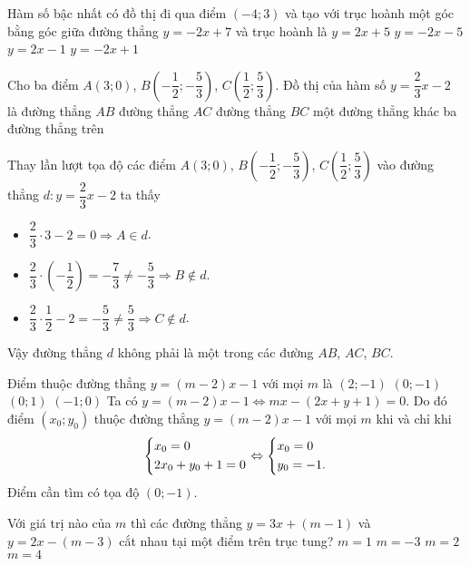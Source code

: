 \begin{ex}%
	Hàm số bậc nhất có đồ thị đi qua điểm $(-4;3)$ và tạo với trục hoành một góc bằng góc giữa đường thẳng $y=-2x+7$ và trục hoành là
	\choice
	{$y=2x+5$}
	{\True $y=-2x-5$}
	{$y=2x-1$}
	{$y=-2x+1$}
\end{ex}


\begin{ex}%
	Cho ba điểm $A(3;0)$, $B\left(-\dfrac{1}{2};-\dfrac{5}{3} \right)$, $C\left(\dfrac{1}{2};\dfrac{5}{3} \right)$. Đồ thị của hàm số $y=\dfrac{2}{3}x-2$ là
	\choice
	{đường thẳng $AB$}
	{đường thẳng $AC$}
	{đường thẳng $BC$}
	{\True một đường thẳng khác ba đường thẳng trên}
	\loigiai
	{
		Thay lần lượt tọa độ các điểm $A(3;0)$, $B\left(-\dfrac{1}{2};-\dfrac{5}{3} \right)$, $C\left(\dfrac{1}{2};\dfrac{5}{3} \right)$ vào đường thẳng $d\colon y=\dfrac{2}{3}x-2$ ta thấy
		\begin{itemize}
			\item $\dfrac{2}{3}\cdot 3-2=0\Rightarrow A\in d$.
			\item $\dfrac{2}{3}\cdot \left(-\dfrac{1}{2}\right)=-\dfrac{7}{3}\neq -\dfrac{5}{3}\Rightarrow B\notin d$.
			\item $\dfrac{2}{3}\cdot \dfrac{1}{2}-2=-\dfrac{5}{3}\neq \dfrac{5}{3}\Rightarrow C\notin d$.
		\end{itemize}
		Vậy đường thẳng $d$ không phải là một trong các đường $AB$, $AC$, $BC$.
	}	
\end{ex}

\begin{ex}%
	Điểm thuộc đường thẳng $y=(m-2)x-1$ với mọi $m$ là
	\choice
	{$(2;-1)$}
	{\True $(0;-1)$}
	{$(0;1)$}
	{$(-1;0)$}
	\loigiai
	{
		Ta có $y=(m-2)x-1\Leftrightarrow mx-(2x+y+1)=0$. Do đó điểm $(x_0;y_0)$ thuộc đường thẳng $y=(m-2)x-1$ với mọi $m$ khi và chỉ khi
		\[\left\{\begin{aligned}&x_0=0\\ &2x_0+y_0+1=0\end{aligned}\right.\Leftrightarrow \left\{\begin{aligned}&x_0=0\\ &y_0=-1.\end{aligned}\right.\]
		Điểm cần tìm có tọa độ $(0;-1)$.
	}
\end{ex}

\begin{ex}%
	Với giá trị nào của $m$ thì các đường thẳng $y=3x+(m-1)$ và $y=2x-(m-3)$ cắt nhau tại một điểm trên trục tung?
	\choice
	{$m=1$}
	{$m=-3$}
	{\True $m=2$}
	{$m=4$}
\end{ex}

